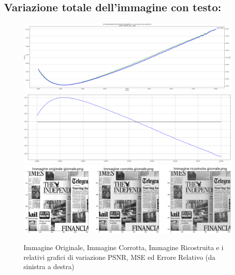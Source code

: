 \subsection{Variazione totale dell'immagine con testo:}
\begin{figure}[H]
    \centering
    \includegraphics[width=\textwidth]{IMMAGINI_RELAZIONE/graficoGiornaleTOTVAR_ERRREL&MSE.png}
    \includegraphics[width=\textwidth]{IMMAGINI_RELAZIONE/graficoGiornaleTOTVAR_PSNR&suaMedia.png}
    \includegraphics[width=\textwidth]{imgRicostruzione/ricostruzioneGiornale_TOTVAR_maxPSNR23.20.png}
    \caption{Immagine Originale, Immagine Corrotta, Immagine Ricostruita e i relativi grafici di variazione PSNR, MSE ed Errore Relativo (da sinistra a destra)}
\end{figure}
